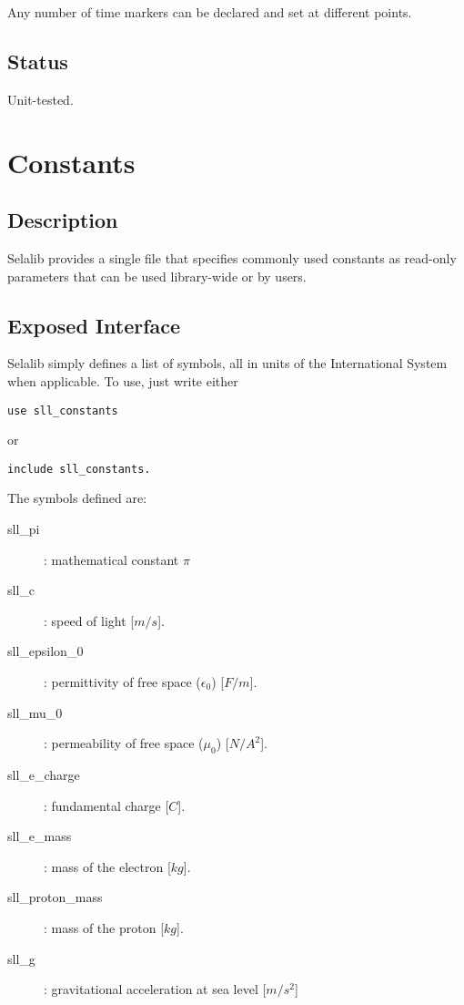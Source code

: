\documentclass[]{report}   %
\begin{document}
Any number of time markers can be declared and set at different points. 

\subsection{Status}
Unit-tested.


\section{Constants}

  \subsection{Description}
  Selalib provides a single file that specifies commonly used constants as read-only parameters that can be used library-wide or by users.

  \subsection{Exposed Interface}
  Selalib simply defines a list of symbols, all in units of the International System when applicable. To use, just write either
  
  \begin{verbatim}
use sll_constants
\end{verbatim}
or
\begin{verbatim}
include sll_constants.
\end{verbatim}
The symbols defined are:
  
  \begin{description}
    \item[sll\_pi]: mathematical constant $\pi$
    \item[sll\_c]: speed of light [$m/s$].
    \item[sll\_epsilon\_0]: permittivity of free space ($\epsilon_0$) [$F/m$].
    \item[sll\_mu\_0]: permeability of free space ($\mu_0$) [$N/A^2$].
    \item[sll\_e\_charge]: fundamental charge [$C$].
    \item[sll\_e\_mass]: mass of the electron [$kg$].
    \item[sll\_proton\_mass]: mass of the proton [$kg$].
    \item[sll\_g]: gravitational acceleration at sea level [$m/s^2$]
  \end{description}
  
\end{document}
